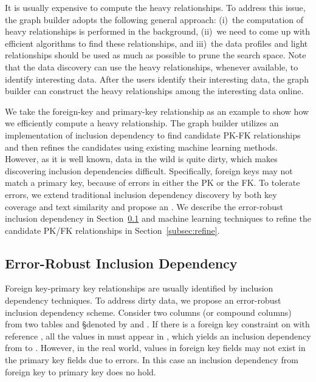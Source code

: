 It is usually expensive to compute the heavy relationships. To address this
issue, the graph builder adopts the following general approach: (i)~the
computation of heavy relationships is performed in the background, (ii)~we need
to come up with efficient algorithms to find these relationships, and iii)~the
data profiles and light relationships should be used as much as possible to
prune the search space. Note that the data discovery can use the heavy
relationships, whenever available, to identify interesting data. After the
users identify their interesting data, the graph builder can construct the heavy
relationships among the interesting data online.

We take the foreign-key and primary-key relationship as an example to show how
we efficiently compute a heavy relationship. The graph builder utilizes an
implementation of inclusion dependency to find candidate PK-FK relationships and
then refines the candidates using existing machine learning methods. However,
as it is well known, data in the wild is quite dirty, which makes discovering
inclusion dependencies difficult. Specifically, foreign keys may not match a
primary key, because of errors in either the PK or the FK. To tolerate errors,
we extend traditional inclusion dependency discovery by both key coverage and
text similarity and propose an \emph{\eind}. We describe the error-robust
inclusion dependency in Section~\ref{subsec:eind} and machine learning
techniques to refine the candidate PK/FK relationships in
Section~\ref{subsec:refine}.

\subsection{Error-Robust Inclusion Dependency}\label{subsec:eind}

Foreign key-primary key relationships are usually identified by inclusion
dependency techniques.  To address dirty data, we propose an error-robust
inclusion dependency scheme.
Consider two columns (or compound columns) from two tables \R and \S denoted by
\RX and \SY. If there is a foreign key constraint on \RX with reference \SY, all
the values in \RX must appear in \SY, which yields an inclusion dependency from
\RX to \SY. However, in the real world, values in foreign key fields may not
exist in the primary key fields due to errors.  In this case an inclusion
dependency from foreign key to primary key does no hold.

